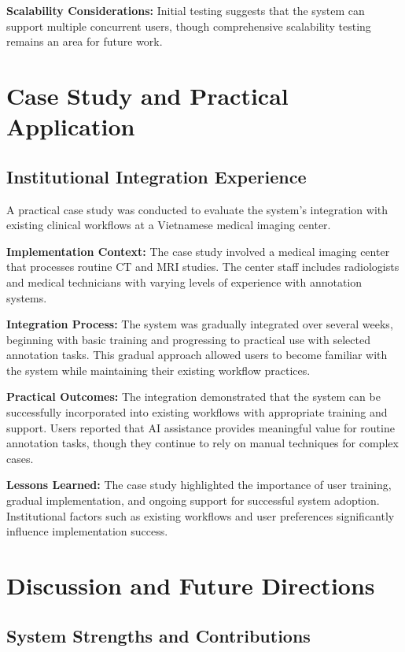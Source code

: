 \begin{table}[htbp]
\textbf{Scalability Considerations:} Initial testing suggests that the system can support multiple concurrent users, though comprehensive scalability testing remains an area for future work.

\section{Case Study and Practical Application}

\subsection{Institutional Integration Experience}

A practical case study was conducted to evaluate the system's integration with existing clinical workflows at a Vietnamese medical imaging center.

\textbf{Implementation Context:} The case study involved a medical imaging center that processes routine CT and MRI studies. The center staff includes radiologists and medical technicians with varying levels of experience with annotation systems.

\textbf{Integration Process:} The system was gradually integrated over several weeks, beginning with basic training and progressing to practical use with selected annotation tasks. This gradual approach allowed users to become familiar with the system while maintaining their existing workflow practices.

\textbf{Practical Outcomes:} The integration demonstrated that the system can be successfully incorporated into existing workflows with appropriate training and support. Users reported that AI assistance provides meaningful value for routine annotation tasks, though they continue to rely on manual techniques for complex cases.

\textbf{Lessons Learned:} The case study highlighted the importance of user training, gradual implementation, and ongoing support for successful system adoption. Institutional factors such as existing workflows and user preferences significantly influence implementation success.

\section{Discussion and Future Directions}

\subsection{System Strengths and Contributions}


\end{table}
